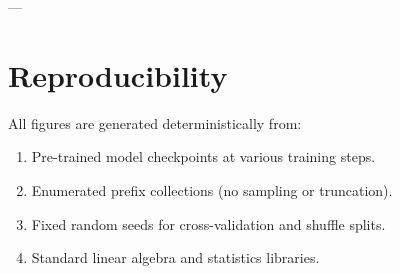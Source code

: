 \documentclass[11pt]{article}
\begin{document}
---

\section*{Reproducibility}

All figures are generated deterministically from:
\begin{enumerate}
\item Pre-trained model checkpoints at various training steps.
\item Enumerated prefix collections (no sampling or truncation).
\item Fixed random seeds for cross-validation and shuffle splits.
\item Standard linear algebra and statistics libraries.
\end{enumerate}
\end{document}
